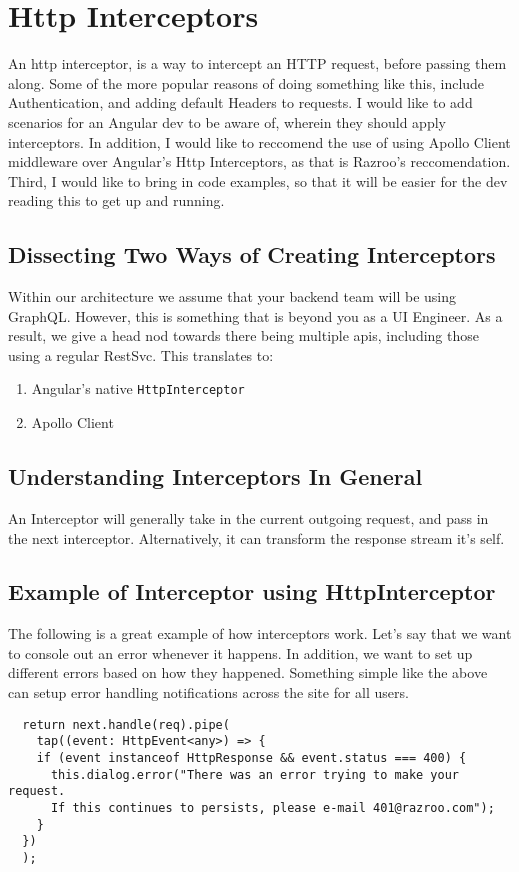\section{ Http Interceptors }
\maketitle{}

An http interceptor, is a way to intercept an HTTP request, before passing them
along. Some of the more popular reasons of doing something like this, include 
Authentication, and adding default Headers to requests. I would like to add 
scenarios for an Angular dev to be aware of, wherein they should apply 
interceptors. In addition, I would like to reccomend the use of using Apollo 
Client middleware over Angular's Http Interceptors, as that is Razroo's 
reccomendation. Third, I would like to bring in code examples, so that it will
be easier for the dev reading this to get up and running.

\subsection{Dissecting Two Ways of Creating Interceptors}
Within our architecture we assume that your backend team will be using GraphQL. 
However, this is something that is beyond you as a UI Engineer. As a result,
we give a head nod towards there being multiple apis, including those using a 
regular RestSvc. This translates to: 
\begin{enumerate}
  \item Angular's native \lstinline{HttpInterceptor}
  \item Apollo Client 
\end{enumerate}

\subsection{Understanding Interceptors In General}
An Interceptor will generally take in the current outgoing request, and pass 
in the next interceptor. Alternatively, it can transform the response stream 
it's self. 

\subsection{Example of Interceptor using HttpInterceptor}

The following is a great example of how interceptors work. Let's say that we
want to console out an error whenever it happens. In addition, we want to 
set up different errors based on how they happened. Something simple like 
the above can setup error handling notifications across the site for all users.  
\begin{lstlisting}
  return next.handle(req).pipe(
    tap((event: HttpEvent<any>) => {
    if (event instanceof HttpResponse && event.status === 400) {
      this.dialog.error("There was an error trying to make your request. 
      If this continues to persists, please e-mail 401@razroo.com");
    }
  })
  );
\end{lstlisting}

